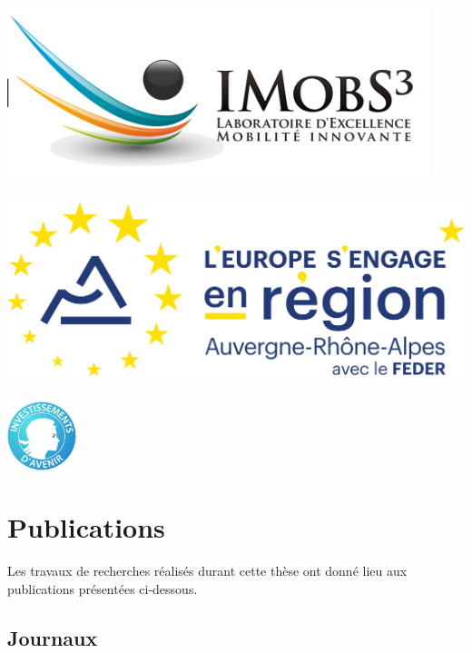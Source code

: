 \documentclass[11pt,a4paper]{report}
\begin{document}


\begin{center}
	\includegraphics[height=5cm]{images_these/IMobS3_Rectangle.jpg}
	
	\includegraphics[height=5.5cm]{images_these/FEDER.jpg}
	
	\includegraphics[height=2cm]{images_these/Investissements_d'avenir_logo.jpeg}
\end{center}
\newpage
\chapter*{Publications}

Les travaux de recherches réalisés durant cette thèse ont donné lieu aux publications présentées ci-dessous.
\section*{Journaux}
\end{document}

